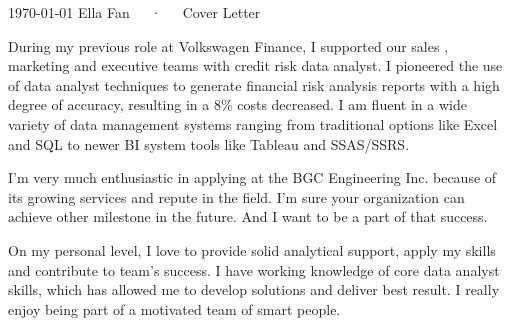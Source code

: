 \documentclass[11pt, a4paper]{awesome-cv}
\begin{document}
\makecvheader[R]

\makecvfooter
  {\today}
  {Ella Fan~~~·~~~Cover Letter}
  {}

\makelettertitle

\begin{cvletter}

During my previous role at Volkswagen Finance, I supported our sales , marketing and executive teams with credit risk data analyst. I pioneered the use of data analyst techniques to generate financial risk analysis reports with a high degree of accuracy, resulting in a 8\% costs decreased. I am fluent in a wide variety of data management systems ranging from traditional options like Excel and SQL to newer BI system tools like Tableau and SSAS/SSRS.

I'm very much enthusiastic in applying at the BGC Engineering Inc. because of its growing services and repute in the field. I'm sure your organization can achieve other milestone in the future. And I want to be a part of that success.

On my personal level, I love to provide solid analytical support, apply my skills and contribute to team's success. I have working knowledge of core data analyst skills, which has allowed me to develop solutions and deliver best result. I really enjoy being part of a motivated team of smart people.

\end{cvletter}


\makeletterclosing
\end{document}
